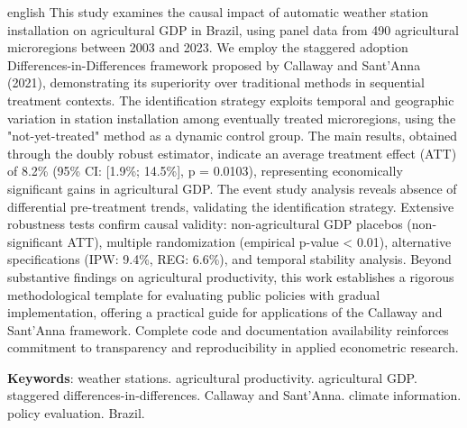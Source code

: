 \documentclass[
	12pt,				%
	oneside,			%
	a4paper,			%
	english,			%
	french,				%
	spanish,			%
	brazil				%
	]{abntex2}
\begin{document}
\begin{resumo}[Abstract]
 \begin{otherlanguage*}{english}
This study examines the causal impact of automatic weather station installation on agricultural GDP in Brazil, using panel data from 490 agricultural microregions between 2003 and 2023. We employ the staggered adoption Differences-in-Differences framework proposed by Callaway and Sant'Anna (2021), demonstrating its superiority over traditional methods in sequential treatment contexts. The identification strategy exploits temporal and geographic variation in station installation among eventually treated microregions, using the "not-yet-treated" method as a dynamic control group. The main results, obtained through the doubly robust estimator, indicate an average treatment effect (ATT) of 8.2\% (95\% CI: [1.9\%; 14.5\%], p = 0.0103), representing economically significant gains in agricultural GDP. The event study analysis reveals absence of differential pre-treatment trends, validating the identification strategy. Extensive robustness tests confirm causal validity: non-agricultural GDP placebos (non-significant ATT), multiple randomization (empirical p-value < 0.01), alternative specifications (IPW: 9.4\%, REG: 6.6\%), and temporal stability analysis. Beyond substantive findings on agricultural productivity, this work establishes a rigorous methodological template for evaluating public policies with gradual implementation, offering a practical guide for applications of the Callaway and Sant'Anna framework. Complete code and documentation availability reinforces commitment to transparency and reproducibility in applied econometric research.

   \textbf{Keywords}: weather stations. agricultural productivity. agricultural GDP. staggered differences-in-differences. Callaway and Sant'Anna. climate information. policy evaluation. Brazil.
 \end{otherlanguage*}
\end{resumo}

\listoffigures*
\cleardoublepage

\listoftables*
\cleardoublepage

\tableofcontents*
\cleardoublepage

\textual
\end{document}
